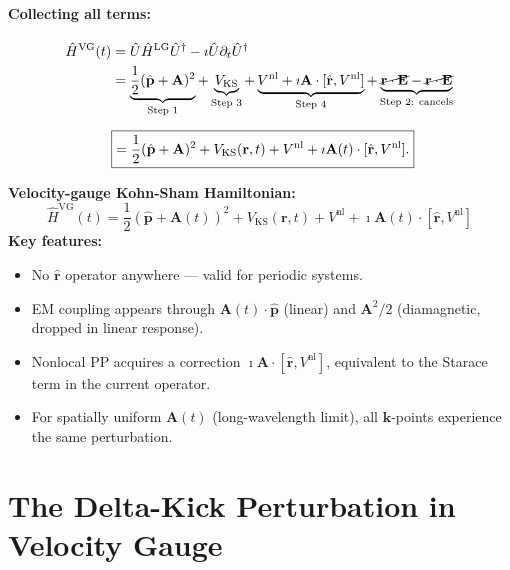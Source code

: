 \documentclass[11pt]{article}
\newcommand{\iunit}{\imath}          %
\newcommand{\Avec}{\mathbf{A}}
\newcommand{\phat}{\hat{\mathbf{p}}}
\newcommand{\Vnl}{V^{\mathrm{nl}}}
\newcommand{\HLG}{\hat{H}^{\mathrm{LG}}}
\newcommand{\HVG}{\hat{H}^{\mathrm{VG}}}
\begin{document}
\paragraph{Collecting all terms:}
\begin{align}
  \HVG(t)
  &= \hat{U}\HLG\hat{U}^\dagger
   - \iunit\hat{U}\partial_t\hat{U}^\dagger
  \nonumber\\
  &= \underbrace{\frac{1}{2}(\phat+\Avec)^2}_{\text{Step 1}}
   + \underbrace{V_\mathrm{KS}}_{\text{Step 3}}
   + \underbrace{\Vnl
     + \iunit\Avec\cdot[\hat{\mathbf{r}},\Vnl]}_{\text{Step 4}}
   + \underbrace{\cancel{\mathbf{r}\cdot\mathbf{E}}
     - \cancel{\mathbf{r}\cdot\mathbf{E}}}_{\text{Step 2: cancels}}
   \nonumber\\[6pt]
  &\boxed{
   = \frac{1}{2}(\phat+\Avec)^2
   + V_\mathrm{KS}(\mathbf{r},t)
   + \Vnl
   + \iunit\Avec(t)\cdot[\hat{\mathbf{r}},\Vnl].
   }
  \label{eq:HVG-final}
\end{align}

\begin{keyresult}
\textbf{Velocity-gauge Kohn-Sham Hamiltonian:}
\begin{equation*}
  \HVG(t)
  = \frac{1}{2}\!\left(\hat{\mathbf{p}} + \Avec(t)\right)^{\!2}
  + V_\mathrm{KS}(\mathbf{r},t)
  + \Vnl
  + \iunit\Avec(t)\cdot\!\left[\hat{\mathbf{r}},\Vnl\right]
\end{equation*}
\textbf{Key features:}
\begin{itemize}
  \item No $\hat{\mathbf{r}}$ operator anywhere --- valid for
    periodic systems.
  \item EM coupling appears through $\Avec(t)\cdot\phat$ (linear)
    and $\Avec^2/2$ (diamagnetic, dropped in linear response).
  \item Nonlocal PP acquires a correction
    $\iunit\Avec\cdot[\hat{\mathbf{r}},\Vnl]$, equivalent to the
    Starace term in the current operator.
  \item For spatially uniform $\Avec(t)$ (long-wavelength limit),
    all $\mathbf{k}$-points experience the same perturbation.
\end{itemize}
\end{keyresult}

\section{The Delta-Kick Perturbation in Velocity Gauge}
\end{document}
